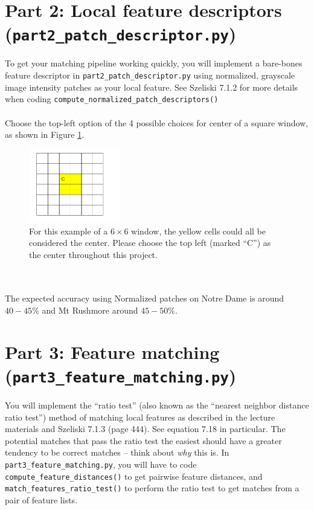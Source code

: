 \documentclass{article}
\begin{document}
\section{Part 2: Local feature descriptors (\lstinline{part2_patch_descriptor.py})}
To get your matching pipeline working quickly, you will implement a bare-bones feature descriptor in \lstinline{part2_patch_descriptor.py} using normalized, grayscale image intensity patches as your local feature. See Szeliski 7.1.2 for more details when coding \lstinline{compute_normalized_patch_descriptors()}
\\
\\
Choose the top-left option of the 4 possible choices for center of a square window, as shown in Figure \ref{fig:window}.

 \begin{figure}[h]
    \centering
    \includegraphics[width=150]{images/window.PNG}
    \caption{For this example of a $6\times6$ window, the yellow cells could all be considered the center. Please choose the top left (marked ``C'') as the center throughout this project.}
    \label{fig:window}
\end{figure}
\\
\\
The expected accuracy using Normalized patches on Notre Dame is around $40-45 \%$ and Mt Rushmore around $45-50 \%$.



\section{Part 3: Feature matching (\lstinline{part3_feature_matching.py})}
You will implement the ``ratio test'' (also known as the ``nearest neighbor distance ratio test'') method of matching local features as described in the lecture materials and Szeliski 7.1.3 (page 444). See equation 7.18 in particular. The potential matches that pass the ratio test the easiest should have a greater tendency to be correct matches -- think about \textit{why} this is. In \lstinline{part3_feature_matching.py}, you will have to code \lstinline{compute_feature_distances()} to get pairwise feature distances, and \lstinline{match_features_ratio_test()} to perform the ratio test to get matches from a pair of feature lists. 
\end{document}
